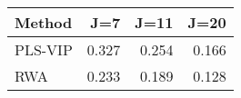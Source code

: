 \begin{small}
\begin{ttfamily}
\begin{tabular}{lrrr}
\toprule
Method & J=7 & J=11 & J=20 \\
\midrule
PLS-VIP & 0.327 & 0.254 & 0.166 \\
RWA & 0.233 & 0.189 & 0.128 \\
\bottomrule
\end{tabular}
\end{ttfamily}
\end{small}
